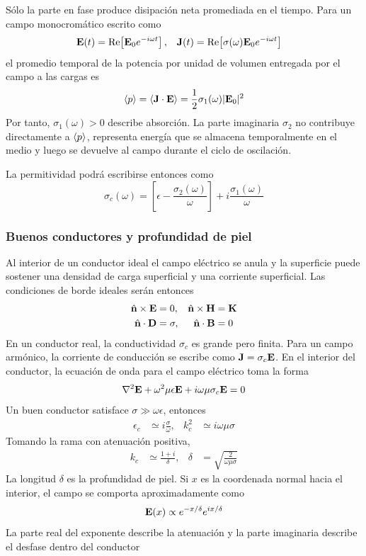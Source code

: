 \documentclass[]{article}
\numberwithin{equation}{section}
\begin{document}
Sólo la parte en fase produce disipación neta promediada en el tiempo. Para un campo monocromático escrito como
\begin{align*}
	\mathbf{E}(t) &= \mathrm{Re}\!\left[\mathbf{E}_0 e^{-i \omega t}\right], & \mathbf{J}(t) &= \mathrm{Re}\!\left[\sigma(\omega) \mathbf{E}_0 e^{-i \omega t}\right]
\end{align*}
el promedio temporal de la potencia por unidad de volumen entregada por el campo a las cargas es
\begin{equation}
	\left\langle p \right\rangle = \left\langle \mathbf{J}\cdot\mathbf{E} \right\rangle = \frac{1}{2} \sigma_1 (\omega) |\mathbf{E}_0|^2
\end{equation}
Por tanto, $\sigma_1(\omega) > 0$ describe absorción. La parte imaginaria $\sigma_2$ no contribuye directamente a $\left\langle p \right\rangle$, representa energía que se almacena temporalmente en el medio y luego se devuelve al campo durante el ciclo de oscilación.

La permitividad podrá escribirse entonces como
\begin{equation}
	\sigma_c(\omega) = \left[\epsilon - \frac{\sigma_2(\omega)}{\omega}\right] + i \frac{\sigma_1(\omega)}{\omega}
\end{equation}

\subsubsection{Buenos conductores y profundidad de piel}
Al interior de un conductor ideal el campo eléctrico se anula y la superficie puede sostener una densidad de carga superficial y una corriente superficial. Las condiciones de borde ideales serán entonces
\begin{align*}
	\hat{\mathbf{n}} \times \mathbf{E} &= 0, & \hat{\mathbf{n}} \times \mathbf{H} &= \mathbf{K}\\
	\hat{\mathbf{n}} \cdot  \mathbf{D} &= \sigma, & \hat{\mathbf{n}} \cdot  \mathbf{B} &= 0
\end{align*}
En un conductor real, la conductividad $\sigma_c$ es grande pero finita. Para un campo armónico, la corriente de conducción se escribe como $\mathbf{J} = \sigma_c \mathbf{E}$. En el interior del conductor, la ecuación de onda para el campo eléctrico toma la forma
\begin{equation}
	\nabla^2\mathbf{E} + \omega^2\mu\epsilon\mathbf{E} + i\omega\mu\sigma_c\mathbf{E} = 0
\end{equation}
Un buen conductor satisface $\sigma \gg \omega \epsilon$, entonces
\begin{align*}
	\epsilon_c &\simeq i \frac{\sigma}{\omega}, & k_c^2 &\simeq i \omega \mu \sigma
\end{align*}
Tomando la rama con atenuación positiva,
\begin{align}
	k_c &\simeq \frac{1 + i}{\delta}, & \delta &= \sqrt{\frac{2}{\omega\mu\sigma}}
\end{align}
La longitud $\delta$ es la profundidad de piel. Si $x$ es la coordenada normal hacia el interior, el campo se comporta aproximadamente como
\begin{equation}
	\mathbf{E}(x) \propto e^{-x/\delta} e^{i x/\delta}
\end{equation}
La parte real del exponente describe la atenuación y la parte imaginaria describe el desfase dentro del conductor
\end{document}
